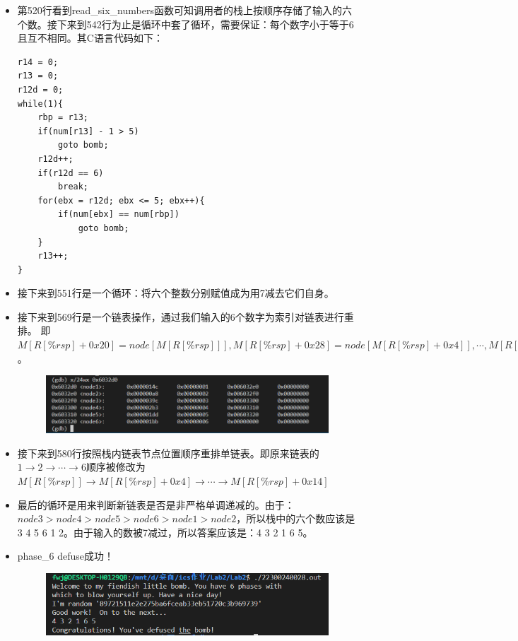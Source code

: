 \documentclass[12pt, a4paper, oneside]{ctexart}
\begin{document}
\begin{itemize}
    \item 第520行看到read\_six\_numbers函数可知调用者的栈上按顺序存储了输入的六个数。接下来到542行为止是循环中套了循环，需要保证：每个数字小于等于6且互不相同。其C语言代码如下：
\begin{lstlisting}
r14 = 0;
r13 = 0;
r12d = 0;
while(1){           
    rbp = r13;
    if(num[r13] - 1 > 5)    
        goto bomb;
    r12d++;         
    if(r12d == 6)
        break;
    for(ebx = r12d; ebx <= 5; ebx++){   
        if(num[ebx] == num[rbp])       
            goto bomb;
    }
    r13++;
}    
\end{lstlisting}
    \item 接下来到551行是一个循环：将六个整数分别赋值成为用7减去它们自身。
    \item 接下来到569行是一个链表操作，通过我们输入的6个数字为索引对链表进行重排。
    即$M[R[\%rsp] + 0x20] = node[M[R[\%rsp]]], M[R[\%rsp] + 0x28] = node[M[R[\%rsp] + 0x4]], \cdots, M[R[\%rsp] + 0x48] = node[M[R[\%rsp] + 0x14]]$。 
    \begin{figure}[htbp]
        \includegraphics[scale=0.6]{image/2.7-3.png}
    \end{figure}
    \item 接下来到580行按照栈内链表节点位置顺序重排单链表。即原来链表的$1\to2\to\cdots\to6$顺序被修改为$M[R[\%rsp]] \to M[R[\%rsp]+0x4] \to\cdots\to M[R[\%rsp]+0x14]$
    \item 最后的循环是用来判断新链表是否是非严格单调递减的。由于：$node3>node4>node5>node6>node1>node2$，所以栈中的六个数应该是3 4 5 6 1 2。由于输入的数被7减过，所以答案应该是：4 3 2 1 6 5。
    \item phase\_6 defuse成功！
    \begin{figure}[htbp]
        \includegraphics[scale=0.7]{image/2.7-4.png}
    \end{figure}
\end{itemize}
\end{document}
